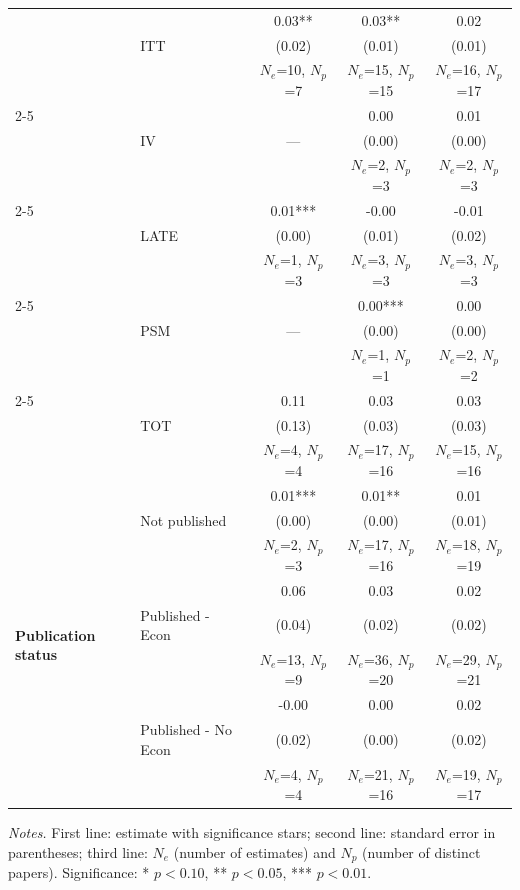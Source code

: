 \begin{table}[htbp]
\begin{tabular*}{\linewidth}{@{\extracolsep{\fill}} l l c c c @{}}
  &  & 0.03** & 0.03** & 0.02 \\
  & ITT & (0.02) & (0.01) & (0.01) \\
  &  & $N_e$=10, $N_p$=7 & $N_e$=15, $N_p$=15 & $N_e$=16, $N_p$=17 \\
\cmidrule(lr){2-5}
  &  &  & 0.00 & 0.01 \\
  & IV & --- & (0.00) & (0.00) \\
  &  &  & $N_e$=2, $N_p$=3 & $N_e$=2, $N_p$=3 \\
\cmidrule(lr){2-5}
  &  & 0.01*** & -0.00 & -0.01 \\
  & LATE & (0.00) & (0.01) & (0.02) \\
  &  & $N_e$=1, $N_p$=3 & $N_e$=3, $N_p$=3 & $N_e$=3, $N_p$=3 \\
\cmidrule(lr){2-5}
  &  &  & 0.00*** & 0.00 \\
  & PSM & --- & (0.00) & (0.00) \\
  &  &  & $N_e$=1, $N_p$=1 & $N_e$=2, $N_p$=2 \\
\cmidrule(lr){2-5}
  &  & 0.11 & 0.03 & 0.03 \\
  & TOT & (0.13) & (0.03) & (0.03) \\
  &  & $N_e$=4, $N_p$=4 & $N_e$=17, $N_p$=16 & $N_e$=15, $N_p$=16 \\
\midrule
\multirow{9}{*}{\textbf{Publication status}}
  &  & 0.01*** & 0.01** & 0.01 \\
  & Not published & (0.00) & (0.00) & (0.01) \\
  &  & $N_e$=2, $N_p$=3 & $N_e$=17, $N_p$=16 & $N_e$=18, $N_p$=19 \\
\cmidrule(lr){2-5}
  &  & 0.06 & 0.03 & 0.02 \\
  & Published - Econ & (0.04) & (0.02) & (0.02) \\
  &  & $N_e$=13, $N_p$=9 & $N_e$=36, $N_p$=20 & $N_e$=29, $N_p$=21 \\
\cmidrule(lr){2-5}
  &  & -0.00 & 0.00 & 0.02 \\
  & Published - No Econ & (0.02) & (0.00) & (0.02) \\
  &  & $N_e$=4, $N_p$=4 & $N_e$=21, $N_p$=16 & $N_e$=19, $N_p$=17 \\
\bottomrule
\end{tabular*}

\vspace{0.3em} %
\parbox{\linewidth}{\scriptsize \textit{Notes.} First line: estimate with significance stars; second line: standard error in parentheses; third line: $N_e$ (number of estimates) and $N_p$ (number of distinct papers). Significance: * $p<0.10$, ** $p<0.05$, *** $p<0.01$.}
\end{table}
